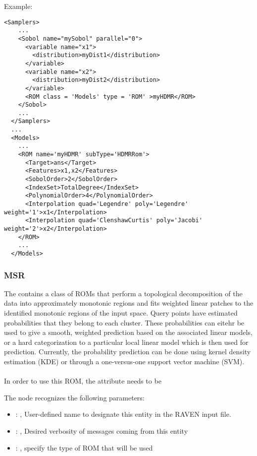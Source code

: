 \hspace{24pt}
Example:
\begin{lstlisting}[style=XML,morekeywords={name,subType}]
  <Samplers>
    ...
    <Sobol name="mySobol" parallel="0">
      <variable name="x1">
        <distribution>myDist1</distribution>
      </variable>
      <variable name="x2">
        <distribution>myDist2</distribution>
      </variable>
      <ROM class = 'Models' type = 'ROM' >myHDMR</ROM>
    </Sobol>
    ...
  </Samplers>
  ...
  <Models>
    ...
    <ROM name='myHDMR' subType='HDMRRom'>
      <Target>ans</Target>
      <Features>x1,x2</Features>
      <SobolOrder>2</SobolOrder>
      <IndexSet>TotalDegree</IndexSet>
      <PolynomialOrder>4</PolynomialOrder>
      <Interpolation quad='Legendre' poly='Legendre' weight='1'>x1</Interpolation>
      <Interpolation quad='ClenshawCurtis' poly='Jacobi' weight='2'>x2</Interpolation>
    </ROM>
    ...
  </Models>
\end{lstlisting}


\subsubsection{MSR}
  The  contains a class of ROMs that perform a topological
  decomposition of the data into approximately monotonic regions and fits weighted
  linear patches to the identified monotonic regions of the input space. Query
  points have estimated probabilities that they belong to each cluster. These
  probabilities can eitehr be used to give a smooth, weighted prediction based on
  the associated linear models, or a hard categorization  to a particular local
  linear model which is then used for prediction. Currently, the probability
  prediction can be done using kernel density estimation (KDE) or through a
  one-versus-one support vector machine (SVM).                             \\
                               \\                             In
  order to use this ROM, the  attribute  needs to
  be 

  The  node recognizes the following parameters:
    \begin{itemize}
      \item {}: , 
        User-defined name to designate this entity in the RAVEN input file.
      \item {}: , 
        Desired verbosity of messages coming from this entity
      \item {}: , 
        specify the type of ROM that will be used
  \end{itemize}

